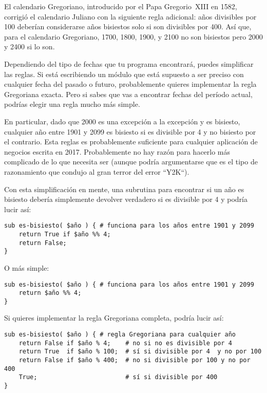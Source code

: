 El calendario Gregoriano, introducido por el Papa Gregorio~XIII
en 1582, corrigió el calendario Juliano con la siguiente regla
adicional: años divisibles por 100 deberían considerarse años bisiestos
solo si son divisibles por 400. Así que, para el calendario Gregoriano,
1700, 1800, 1900, y 2100 no son bisiestos pero 2000 y 2400 si lo son.

Dependiendo del tipo de fechas que tu programa encontrará,
puedes simplificar las reglas. Si está escribiendo un módulo
que está supuesto a ser preciso con cualquier fecha del pasado
o futuro, probablemente quieres implementar la regla Gregoriana
exacta. Pero si sabes que vas a encontrar fechas del período 
actual, podrías elegir una regla mucho más simple.

En particular, dado que 2000 es una excepción a la excepción
y es bisiesto, cualquier año entre 1901 y 2099 es bisiesto si
es divisible por 4 y no bisiesto por el contrario. Esta reglas
es probablemente suficiente para cualquier aplicación de negocios
escrita en 2017. Probablemente no hay razón para  hacerlo más
complicado de lo que necesita ser (aunque podría argumentarse
que es el tipo de razonamiento que condujo al gran terror del 
error ``Y2K``).

Con esta simplificación en mente, una subrutina para encontrar
si un año es bisiesto debería simplemente devolver verdadero
si es divisible por 4 y podría lucir así:

\begin{verbatim}
sub es-bisiesto( $año ) { # funciona para los años entre 1901 y 2099
    return True if $año %% 4; 
    return False;
}
\end{verbatim}

O más simple:
\begin{verbatim}
sub es-bisiesto( $año ) { # funciona para los años entre 1901 y 2099
	return $año %% 4; 
}
\end{verbatim}

Si quieres implementar la regla Gregoriana completa,
podría lucir así:

\begin{verbatim}
sub es-bisiesto( $año ) { # regla Gregoriana para cualquier año
    return False if $año % 4;    # no si no es divisible por 4
    return True  if $año % 100;  # sí si divisible por 4  y no por 100
    return False if $año % 400;  # no si divisible por 100 y no por 400
    True;                        # sí si divisible por 400
}
\end{verbatim}

